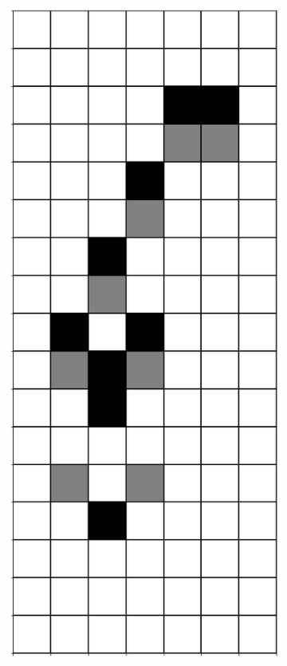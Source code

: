 \documentclass[12pt]{article}
\numberwithin{figure}{section} %
\begin{document}
\begin{figure}[H]
\begin{subfigure}{0.3\textwidth}
     \subcaption{}
   \end{subfigure}
        \begin{subfigure}{0.3\textwidth}
     \centering
     \includegraphics[angle=270,width=\linewidth]{Section4/14.2}

\end{subfigure}
\end{figure}
\end{document}
